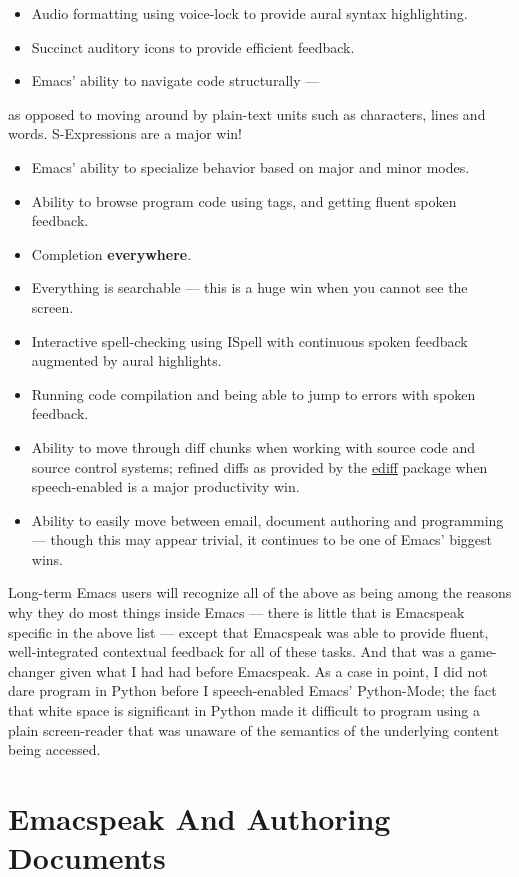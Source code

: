 \documentclass[11pt]{article}
\begin{document}
\begin{itemize}
\item Audio formatting using voice-lock to provide aural syntax
highlighting.
\item Succinct auditory icons to provide efficient feedback.
\item Emacs' ability to navigate code structurally   —
\end{itemize}
as opposed to moving around by plain-text units such as
  characters, lines and words. S-Expressions are a major win!
\begin{itemize}
\item Emacs' ability to specialize behavior based on major and
minor modes.
\item Ability to browse program code using  tags, and getting
fluent spoken feedback.
\item Completion \textbf{everywhere}.
\item Everything is searchable   —   this is a huge win when you
cannot see the screen.
\item Interactive spell-checking using ISpell with continuous
spoken feedback augmented by aural highlights.
\item Running code compilation  and being able to jump to errors
with spoken feedback.
\item Ability to move through diff chunks when working with source
code and source control systems; refined diffs as provided by
the \uline{ediff} package when speech-enabled is a major
productivity win.
\item Ability to easily move between email, document authoring and
programming — though this may appear trivial, it continues to
be one of Emacs' biggest wins.
\end{itemize}


Long-term Emacs users will recognize all of the above as being
among the reasons why they do most things inside Emacs — there is
little that is Emacspeak specific in the above list — except that
Emacspeak was able to provide fluent, well-integrated contextual
feedback for all of these tasks. And that was a game-changer
given what I had had before Emacspeak. As a case in point, I did
not dare program in Python before I speech-enabled Emacs'
Python-Mode; the fact that white space is significant in Python
made it difficult to program using a plain screen-reader that was
unaware of the semantics of the underlying content being
accessed.

\section{Emacspeak And Authoring Documents}
\label{sec-6}
\end{document}
